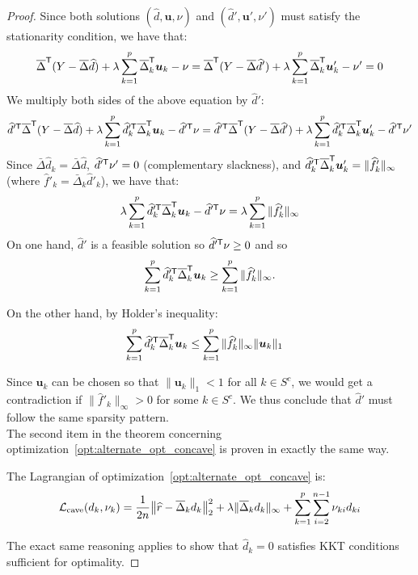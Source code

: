\begin{proof}
Since both solutions $(\hat{d}, \mathbf{u}, \nu)$ and $(\hat{d}', \mathbf{u}', \nu')$ must satisfy the stationarity condition, we have that:
\[
\overline{\Delta}^{\mathsf{T}} ( Y - \overline{\Delta} \widehat{d} ) 
   + \lambda \sum_{k=1}^p \overline{\Delta}_k^{\mathsf{T}} \mbox{\boldmath $u$}_k - \nu = 
\overline{\Delta}^{\mathsf{T}} ( Y - \overline{\Delta} \widehat{d}' ) 
   + \lambda \sum_{k=1}^p \overline{\Delta}_k^{\mathsf{T}} \mbox{\boldmath $u$}'_k - \nu' = 0
\] 
We multiply both sides of the above equation by $\hat{d}'$:
\[
\widehat{d}'^{\mathsf{T}}  \overline{\Delta}^{\mathsf{T}} ( Y - \overline{\Delta} \widehat{d} ) 
    + \lambda \sum_{k=1}^p \widehat{d}'^{\mathsf{T}}_k \overline{\Delta}_k^{\mathsf{T}} \mbox{\boldmath $u$}_k - \widehat{d}'^{\mathsf{T}} \nu = \widehat{d}'^{\mathsf{T}}  \overline{\Delta}^{\mathsf{T}} ( Y - \overline{\Delta} \widehat{d}' ) 
    + \lambda \sum_{k=1}^p \widehat{d}'^{\mathsf{T}}_k \overline{\Delta}_k^{\mathsf{T}} \mbox{\boldmath $u$}'_k - \widehat{d}'^{\mathsf{T}} \nu'
\]
Since $\bar{\Delta} \hat{d}_k = \bar{\Delta} \hat{d}$, $\widehat{d}'^{\mathsf{T}} \nu' = 0$ (complementary slackness), and $\widehat{d}'^{\mathsf{T}}_k \overline{\Delta}_k^{\mathsf{T}} \mbox{\boldmath $u$}'_k  = \| \widehat{f}'_k \|_\infty$ (where $\hat{f}'_k = \bar{\Delta}_k \hat{d}'_k$), we have that:
\[
\lambda \sum_{k=1}^p \widehat{d}'^{\mathsf{T}}_k \overline{\Delta}_k^{\mathsf{T}} \mbox{\boldmath $u$}_k - \widehat{d}'^{\mathsf{T}} \nu = \lambda \sum_{k=1}^p \| \widehat{f}'_k \|_\infty
\]
On one hand, $\hat{d}'$ is a feasible solution so $\widehat{d}'^{\mathsf{T}} \nu \geq 0$ and so 
\[
\sum_{k=1}^p \widehat{d}'^{\mathsf{T}}_k \overline{\Delta}_k^{\mathsf{T}} \mbox{\boldmath $u$}_k \geq \sum_{k=1}^p \| \widehat{f}'_k \|_\infty .
\]

On the other hand, by Holder's inequality:
\begin{align*}
\sum_{k=1}^p \widehat{d}'^{\mathsf{T}}_k \overline{\Delta}_k^{\mathsf{T}} \mbox{\boldmath $u$}_k &\leq 
   \sum_{k=1}^p \| \widehat{f}'_k \|_\infty \|\mbox{\boldmath $u$}_k \|_1 
\end{align*}

Since $\mathbf{u}_k$ can be chosen so that $\| \mathbf{u}_k \|_1 < 1$ for all $k \in S^c$, we would get a contradiction if $\| \hat{f}'_k \|_\infty > 0$ for some $k \in S^c$. We thus conclude that $\hat{d}'$ must follow the same sparsity pattern.\\


The second item in the theorem concerning optimization~\ref{opt:alternate_opt_concave} is proven in exactly the same way. 

The Lagrangian of optimization~\ref{opt:alternate_opt_concave} is:
\[
\mathcal{L}_{\textrm{cave}}(d_k, \nu_k) = 
  \frac{1}{2n} \big\| \widehat{r} - \overline{\Delta}_k d_k \big \|_2^2 + 
  \lambda \| \overline{\Delta}_k d_k \|_\infty + \sum_{k=1}^p \sum_{i=2}^{n-1} \nu_{ki} d_{ki}
\]

The exact same reasoning applies to show that $\hat{d}_k = 0$ satisfies KKT conditions sufficient for optimality.

\end{proof}
 

